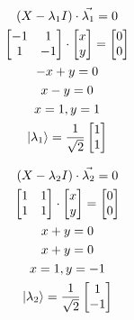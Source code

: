 \documentclass[]{article}
\begin{document}
\begin{enumerate}
\begin{enumerate}
          \noindent\begin{minipage}{.49\linewidth}
            \begin{gather*}
              (X - \lambda_1 I) \cdot \vec{\lambda_1} = 0\\
              \begin{bmatrix}
                -1 & 1\\
                1 & -1
              \end{bmatrix}
              \cdot 
              \begin{bmatrix}
                x\\ y
              \end{bmatrix}
              = \begin{bmatrix}
                0\\0
              \end{bmatrix}\\
              -x+y=0\\
              x-y=0\\
              x = 1, y = 1\\
              \ket{\lambda_1} = \frac{1}{\sqrt{2}}\begin{bmatrix}
                1\\1
              \end{bmatrix}
            \end{gather*}
          \end{minipage}
          \begin{minipage}{.49\linewidth}
            \begin{gather*}
              (X - \lambda_2 I) \cdot \vec{\lambda_2} = 0\\
              \begin{bmatrix}
                1 & 1\\
                1 & 1
              \end{bmatrix}
              \cdot 
              \begin{bmatrix}
                x\\ y
              \end{bmatrix}
              = \begin{bmatrix}
                0\\0
              \end{bmatrix}\\
              x+y=0\\
              x+y=0\\
              x = 1, y = -1\\
              \ket{\lambda_2} = \frac{1}{\sqrt{2}}\begin{bmatrix}
                1\\-1
              \end{bmatrix}
            \end{gather*}
          \end{minipage}


\end{enumerate}
\end{enumerate}
\end{document}
